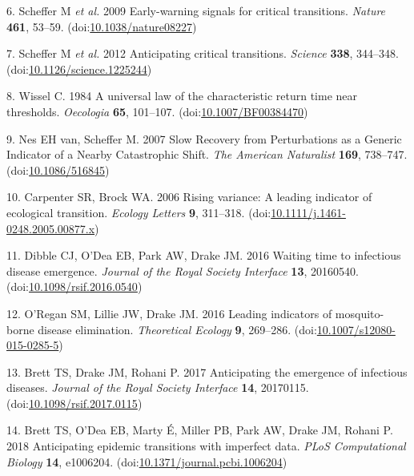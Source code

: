 \documentclass[3p]{elsarticle} %
\begin{document}
\leavevmode\hypertarget{ref-Scheffer2009}{}%
6. Scheffer M \emph{et al.} 2009 Early-warning signals for critical
transitions. \emph{Nature} \textbf{461}, 53--59.
(doi:\href{https://doi.org/10.1038/nature08227}{10.1038/nature08227})

\leavevmode\hypertarget{ref-Scheffer2012}{}%
7. Scheffer M \emph{et al.} 2012 Anticipating critical transitions.
\emph{Science} \textbf{338}, 344--348.
(doi:\href{https://doi.org/10.1126/science.1225244}{10.1126/science.1225244})

\leavevmode\hypertarget{ref-Wissel1984}{}%
8. Wissel C. 1984 A universal law of the characteristic return time near
thresholds. \emph{Oecologia} \textbf{65}, 101--107.
(doi:\href{https://doi.org/10.1007/BF00384470}{10.1007/BF00384470})

\leavevmode\hypertarget{ref-VanNes2007}{}%
9. Nes EH van, Scheffer M. 2007 Slow Recovery from Perturbations as a
Generic Indicator of a Nearby Catastrophic Shift. \emph{The American
Naturalist} \textbf{169}, 738--747.
(doi:\href{https://doi.org/10.1086/516845}{10.1086/516845})

\leavevmode\hypertarget{ref-Carpenter2006}{}%
10. Carpenter SR, Brock WA. 2006 Rising variance: A leading indicator of
ecological transition. \emph{Ecology Letters} \textbf{9}, 311--318.
(doi:\href{https://doi.org/10.1111/j.1461-0248.2005.00877.x}{10.1111/j.1461-0248.2005.00877.x})

\leavevmode\hypertarget{ref-Dibble2016}{}%
11. Dibble CJ, O'Dea EB, Park AW, Drake JM. 2016 Waiting time to
infectious disease emergence. \emph{Journal of the Royal Society
Interface} \textbf{13}, 20160540.
(doi:\href{https://doi.org/10.1098/rsif.2016.0540}{10.1098/rsif.2016.0540})

\leavevmode\hypertarget{ref-ORegan2016}{}%
12. O'Regan SM, Lillie JW, Drake JM. 2016 Leading indicators of
mosquito-borne disease elimination. \emph{Theoretical Ecology}
\textbf{9}, 269--286.
(doi:\href{https://doi.org/10.1007/s12080-015-0285-5}{10.1007/s12080-015-0285-5})

\leavevmode\hypertarget{ref-Brett2017}{}%
13. Brett TS, Drake JM, Rohani P. 2017 Anticipating the emergence of
infectious diseases. \emph{Journal of the Royal Society Interface}
\textbf{14}, 20170115.
(doi:\href{https://doi.org/10.1098/rsif.2017.0115}{10.1098/rsif.2017.0115})

\leavevmode\hypertarget{ref-Brett2018}{}%
14. Brett TS, O'Dea EB, Marty É, Miller PB, Park AW, Drake JM, Rohani P.
2018 Anticipating epidemic transitions with imperfect data. \emph{PLoS
Computational Biology} \textbf{14}, e1006204.
(doi:\href{https://doi.org/10.1371/journal.pcbi.1006204}{10.1371/journal.pcbi.1006204})
\end{document}
